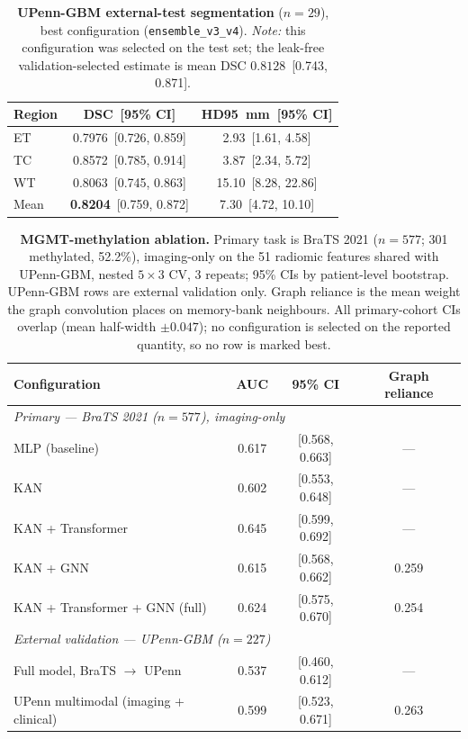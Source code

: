 \begin{table}[t]
  \centering
  \caption[UPenn-GBM external segmentation]{\textbf{UPenn-GBM external-test
  segmentation} ($n=29$), best configuration (\texttt{ensemble\_v3\_v4}).
  \emph{Note:} this configuration was selected on the test set; the leak-free
  validation-selected estimate is mean DSC $0.8128$~[0.743, 0.871].}
  \label{tab:upenn-seg}
  \begin{tabular}{lcc}
    \toprule
    Region & DSC~[95\% CI] & HD95~mm~[95\% CI] \\
    \midrule
    ET   & 0.7976~[0.726, 0.859] & 2.93~[1.61, 4.58] \\
    TC   & 0.8572~[0.785, 0.914] & 3.87~[2.34, 5.72] \\
    WT   & 0.8063~[0.745, 0.863] & 15.10~[8.28, 22.86] \\
    \midrule
    Mean & \textbf{0.8204}~[0.759, 0.872] & 7.30~[4.72, 10.10] \\
    \bottomrule
  \end{tabular}
\end{table}

\begin{table}[t]
  \centering
  \caption[MGMT ablation]{\textbf{MGMT-methylation ablation.} Primary task is
  BraTS 2021 ($n=577$; 301 methylated, 52.2\%), imaging-only on the 51 radiomic
  features shared with UPenn-GBM, nested $5\times3$ CV, 3 repeats; 95\% CIs by
  patient-level bootstrap. UPenn-GBM rows are external validation only. Graph
  reliance is the mean weight the graph convolution places on memory-bank
  neighbours. All primary-cohort CIs overlap (mean half-width $\pm0.047$); no
  configuration is selected on the reported quantity, so no row is marked best.}
  \label{tab:mgmt-ablation}
  \begin{tabular}{lccc}
    \toprule
    Configuration & AUC & 95\% CI & Graph reliance \\
    \midrule
    \multicolumn{4}{l}{\emph{Primary — BraTS 2021 ($n=577$), imaging-only}} \\
    MLP (baseline)                 & 0.617 & [0.568, 0.663] & --- \\
    KAN                            & 0.602 & [0.553, 0.648] & --- \\
    KAN + Transformer              & 0.645 & [0.599, 0.692] & --- \\
    KAN + GNN                      & 0.615 & [0.568, 0.662] & 0.259 \\
    KAN + Transformer + GNN (full) & 0.624 & [0.575, 0.670] & 0.254 \\
    \midrule
    \multicolumn{4}{l}{\emph{External validation — UPenn-GBM ($n=227$)}} \\
    Full model, BraTS $\rightarrow$ UPenn & 0.537 & [0.460, 0.612] & --- \\
    UPenn multimodal (imaging + clinical) & 0.599 & [0.523, 0.671] & 0.263 \\
    \bottomrule
  \end{tabular}
\end{table}

